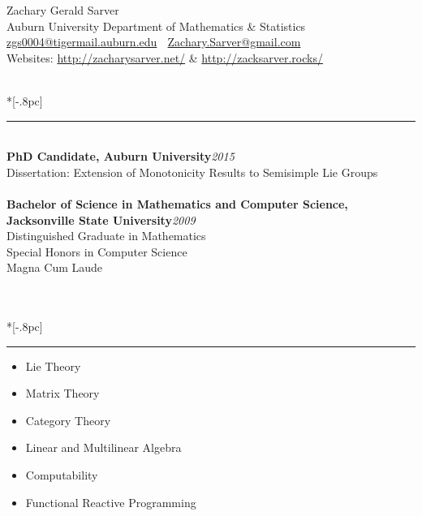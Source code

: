 \documentclass{article}
\begin{document}
\thispagestyle{empty}

\begin{center}
{\Large Zachary Gerald Sarver} \\[.5pc]
Auburn University Department of Mathematics \& Statistics \\
\href{mailto:zgs0004@tigermail.auburn.edu}{zgs0004@tigermail.auburn.edu} $\;$
\href{mailto:Zachary.Sarver@gmail.com}{Zachary.Sarver@gmail.com} \\
Websites: \url{http://zacharysarver.net/} \& \url{http://zacksarver.rocks/}
\end{center}

 \\*[-.8pc]
\rule{\textwidth}{.1pt} \\
{\bf PhD Candidate, Auburn University}\hfill {\it 2015} \\
Dissertation: Extension of Monotonicity Results to Semisimple Lie Groups \\
\\
{\bf Bachelor of Science in Mathematics and Computer Science,\\ Jacksonville State
University}\hfill {\it 2009}\\
Distinguished Graduate in Mathematics\\
Special Honors in Computer Science\\
Magna Cum Laude\\

\

 \\*[-.8pc]
\rule{\textwidth}{.1pt} 
\begin{multicols}{2}
\begin{itemize}[noitemsep]
\item Lie Theory
\item Matrix Theory
\item Category Theory
\item Linear and Multilinear Algebra
\item Computability
\item Functional Reactive Programming
\end{itemize}
\end{multicols}
\end{document}
